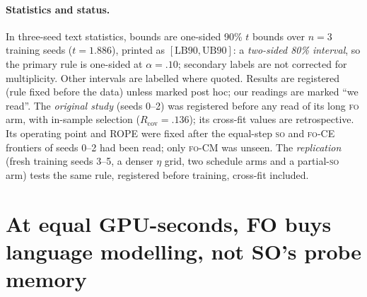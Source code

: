 \documentclass[11pt]{article}
\newcommand{\FO}{\textsc{fo}}
\newcommand{\SO}{\textsc{so}}
\newcommand{\Rcov}{\ensuremath{R_{\mathrm{cov}}}}
\newcommand{\LB}{\ensuremath{\mathrm{LB90}}}
\newcommand{\UB}{\ensuremath{\mathrm{UB90}}}
\begin{document}
\paragraph{Statistics and status.}
In three-seed text statistics, bounds are one-sided 90\% $t$ bounds over $n=3$ training seeds ($t=1.886$), printed as $[\LB,\UB]$: a \emph{two-sided 80\%
interval}, so the primary rule is one-sided at $\alpha=.10$; secondary labels are not corrected for
multiplicity. Other intervals are labelled where quoted. Results are registered (rule fixed before the
data) unless marked post hoc; our readings are marked ``we read''. The \emph{original study} (seeds
0--2) was registered before any read of its long \FO{} arm, with in-sample selection ($\Rcov=.136$);
its cross-fit values are retrospective. Its operating point and ROPE were fixed after the equal-step
\SO{} and \FO-CE{} frontiers of seeds 0--2 had been read; only \FO-CM{} was unseen. The
\emph{replication} (fresh training seeds 3--5, a denser $\eta$ grid, two schedule arms and a
partial-\SO{} arm) tests the same rule, registered before training, cross-fit included.

\section{At equal GPU-seconds, FO buys language modelling, not SO's probe memory}
\label{sec:text}
\end{document}
